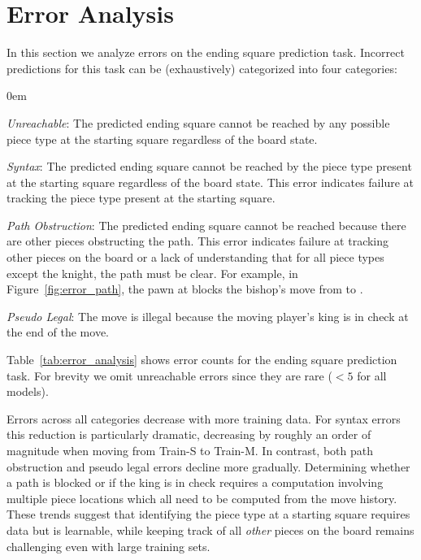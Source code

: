 
\section{Error Analysis}
\label{sec:error_analysis}

In this section we analyze errors %
on the ending square prediction task. 
Incorrect predictions for this task %
can be (exhaustively) categorized into four categories:

\begin{itemizesquish}
	\itemsep0em 
	\item {\em Unreachable}: The predicted ending square cannot be reached %
	by any possible piece type %
	at the starting square regardless of the board state. 
	\item {\em Syntax}: The predicted ending square cannot be reached %
	by the piece type present at the starting square regardless of the board state. This error indicates failure at tracking the piece type present at the starting square. 
	\item {\em Path Obstruction}: The predicted ending square cannot be reached 
	because there are other pieces obstructing the %
	path. This error indicates failure at tracking other pieces on the board or a lack of %
	understanding that for all piece types except the knight, the path %
	must be clear. %
	For example, in Figure~\ref{fig:error_path}, the pawn at  blocks the bishop's move from  to .
	\item {\em Pseudo Legal}: 
	The move is illegal because the moving player's king is in check at the end of the move. 
\end{itemizesquish}
Table~\ref{tab:error_analysis} shows error counts for the ending square prediction task. 
For brevity we omit unreachable errors since they are rare ($< 5$ for all models).


Errors across all categories decrease with more training data. For syntax errors this reduction is particularly dramatic, decreasing by roughly an order of magnitude when moving from Train-S to Train-M. %
In contrast, both path obstruction and pseudo legal errors decline more gradually.
Determining whether a path is blocked or if the king is in check requires a computation involving multiple piece locations which all need to be computed from the move  history. 
These trends suggest that identifying the piece type at a starting square 
requires data but is learnable, while keeping track of all \emph{other} pieces  on the board remains challenging even with large training sets.

